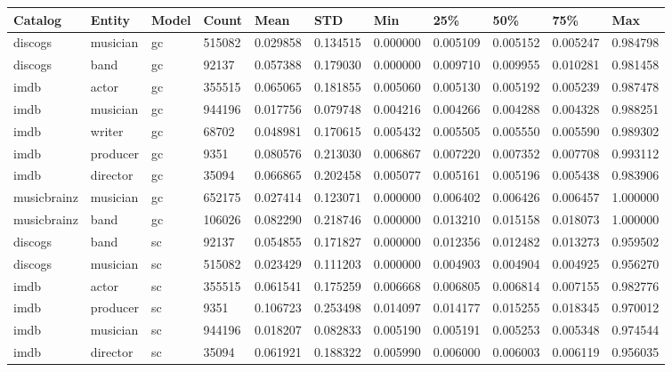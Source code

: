 \documentclass[epsfig,a4paper,11pt,titlepage,twoside,openany]{book}
\begin{document}
\begin{longtable}{|l|l|l|l|l|l|l|l|l|l|l|}
\hline
Catalog     & Entity   & Model                    & Count  & Mean     & STD      & Min      & 25\%     & 50\%     & 75\%     & Max      \\ \hline
discogs     & musician & gc        & 515082 & 0.029858 & 0.134515 & 0.000000 & 0.005109 & 0.005152 & 0.005247 & 0.984798 \\
discogs     & band     & gc        & 92137  & 0.057388 & 0.179030 & 0.000000 & 0.009710 & 0.009955 & 0.010281 & 0.981458 \\
imdb        & actor    & gc        & 355515 & 0.065065 & 0.181855 & 0.005060 & 0.005130 & 0.005192 & 0.005239 & 0.987478 \\
imdb        & musician & gc        & 944196 & 0.017756 & 0.079748 & 0.004216 & 0.004266 & 0.004288 & 0.004328 & 0.988251 \\
imdb        & writer   & gc        & 68702  & 0.048981 & 0.170615 & 0.005432 & 0.005505 & 0.005550 & 0.005590 & 0.989302 \\
imdb        & producer & gc        & 9351   & 0.080576 & 0.213030 & 0.006867 & 0.007220 & 0.007352 & 0.007708 & 0.993112 \\
imdb        & director & gc        & 35094  & 0.066865 & 0.202458 & 0.005077 & 0.005161 & 0.005196 & 0.005438 & 0.983906 \\
musicbrainz & musician & gc        & 652175 & 0.027414 & 0.123071 & 0.000000 & 0.006402 & 0.006426 & 0.006457 & 1.000000 \\
musicbrainz & band     & gc        & 106026 & 0.082290 & 0.218746 & 0.000000 & 0.013210 & 0.015158 & 0.018073 & 1.000000 \\ \hline
discogs     & band     & sc      & 92137  & 0.054855 & 0.171827 & 0.000000 & 0.012356 & 0.012482 & 0.013273 & 0.959502 \\
discogs     & musician & sc      & 515082 & 0.023429 & 0.111203 & 0.000000 & 0.004903 & 0.004904 & 0.004925 & 0.956270 \\
imdb        & actor    & sc      & 355515 & 0.061541 & 0.175259 & 0.006668 & 0.006805 & 0.006814 & 0.007155 & 0.982776 \\
imdb        & producer & sc      & 9351   & 0.106723 & 0.253498 & 0.014097 & 0.014177 & 0.015255 & 0.018345 & 0.970012 \\
imdb        & musician & sc      & 944196 & 0.018207 & 0.082833 & 0.005190 & 0.005191 & 0.005253 & 0.005348 & 0.974544 \\
imdb        & director & sc      & 35094  & 0.061921 & 0.188322 & 0.005990 & 0.006000 & 0.006003 & 0.006119 & 0.956035 \\

\end{longtable}
\end{document}
